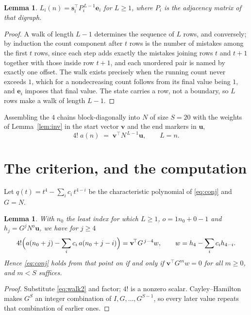\documentclass[11pt,a4paper]{article}
\theoremstyle{plain}
\newtheorem{lemma}[theorem]{Lemma}
\theoremstyle{definition}
\begin{document}
\begin{lemma}\label{lem:walk}
$L_i(n)=\mathbf{s}_i^{\!\top}P_i^{\,L-1}\mathbf{e}_i$ for $L\ge1$, where $P_i$ is the
adjacency matrix of that digraph.
\end{lemma}

\begin{proof}
A walk of length $L-1$ determines the sequence of $L$ rows, and conversely; by induction
the count component after $t$ rows is the number of mistakes among the first $t$ rows,
since each step adds exactly the mistakes joining rows $t$ and $t+1$ together with those
inside row $t+1$, and each unordered pair is named by exactly one offset. The walk exists
precisely when the running count never exceeds $1$, which for a nondecreasing count follows
from its final value being $1$, and $\mathbf{e}_i$ imposes that final value. The state
carries a row, not a boundary, so $L$ rows make a walk of length $L-1$.
\end{proof}

Assembling the $4$ chains block-diagonally into $N$ of size $S=20$ with the weights of
Lemma~\ref{lem:inv} in the start vector $\mathbf{v}$ and the end markers in
$\mathbf{u}$,
\begin{equation}\label{eq:walk2}
4!\;a(n)\;=\;\mathbf{v}^{\!\top}N^{\,L-1}\mathbf{u},\qquad L=n .
\end{equation}

\section{The criterion, and the computation}

Let $q(t)=t^{4}-\sum_i c_i\,t^{4-i}$ be the characteristic polynomial of
\eqref{eq:conj} and $G=N$.

\begin{lemma}\label{lem:crit}
With $n_0$ the least index for which $L\ge1$, $o=1n_0+0-1$ and
$h_j=G^{j}N^{o}\mathbf{u}$, we have for $j\ge4$
\[
4!\Bigl(a(n_0+j)-\sum_i c_i\,a(n_0+j-i)\Bigr)=\mathbf{v}^{\!\top}G^{\,j-4}w,
\qquad w=h_{4}-\sum_i c_ih_{4-i} .
\]
Hence \eqref{eq:conj} holds from that point on if and only if
$\mathbf{v}^{\!\top}G^{m}w=0$ for all $m\ge0$, and $m<S$ suffices.
\end{lemma}

\begin{proof}
Substitute \eqref{eq:walk2} and factor; $4!$ is a nonzero scalar. Cayley--Hamilton
makes $G^{S}$ an integer combination of $I,G,\dots,G^{S-1}$, so every later value repeats
that combination of earlier ones.
\end{proof}
\end{document}
